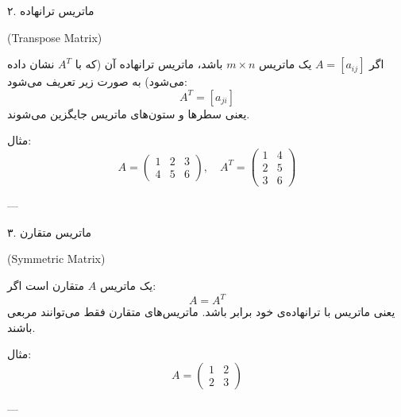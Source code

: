 	\begin{definition}
		 ۲. ماتریس ترانهاده\begin{latin}
		 	 (Transpose Matrix)
		 \end{latin}
	اگر \( A = [a_{ij}] \) یک ماتریس \( m \times n \) باشد، ماتریس ترانهاده آن (که با \( A^T \) نشان داده می‌شود) به صورت زیر تعریف می‌شود:
	\[
	A^T = [a_{ji}]
	\]
	یعنی سطرها و ستون‌های ماتریس جایگزین می‌شوند.
	
	 مثال:
	\[
	A = \begin{pmatrix}
		1 & 2 & 3 \\
		4 & 5 & 6
	\end{pmatrix}, \quad
	A^T = \begin{pmatrix}
		1 & 4 \\
		2 & 5 \\
		3 & 6
	\end{pmatrix}
	\]
	
	---
	\end{definition}
	\begin{definition}
		
	 ۳. ماتریس متقارن \begin{latin}
	 	(Symmetric Matrix)
	 \end{latin}
	یک ماتریس \( A \) متقارن است اگر:
	\[
	A = A^T
	\]
	یعنی ماتریس با ترانهاده‌ی خود برابر باشد. ماتریس‌های متقارن فقط می‌توانند مربعی باشند.
	
	 مثال:
	\[
	A = \begin{pmatrix}
		1 & 2 \\
		2 & 3
	\end{pmatrix}
	\]
	
	---
	\end{definition}
	
